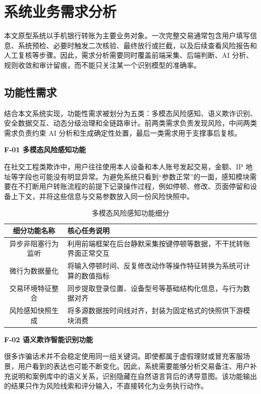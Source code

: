 \documentclass{xduugthesis}
\begin{document}
\section{系统业务需求分析}

本文原型系统以手机银行转账为主要业务对象。一次完整交易通常包含用户填写信息、系统预检、必要时触发二次核验、最终放行或拦截，以及后续查看风险报告和人工复核等步骤。因此，需求分析需要同时覆盖前端采集、后端判断、AI 分析、规则收敛和审计留痕，而不能只关注某一个识别模型的准确率。

\subsection{功能性需求}

结合本文系统实现，功能性需求被划分为五类：多模态风险感知、语义欺诈识别、安全数据交互、动态分级治理和全链路审计。前两类需求负责发现风险，中间两类需求负责约束 AI 分析和生成确定性处置，最后一类需求用于支撑事后复核。

\textbf{F-01 多模态风险感知功能}

在社交工程类欺诈中，用户往往使用本人设备和本人账号发起交易，金额、IP 地址等字段也可能没有明显异常。为避免系统只看到“参数正常”的一面，感知模块需要在不打断用户转账流程的前提下记录操作过程，例如停顿、修改、页面停留和设备上下文，并将这些信息与交易参数放入同一份风险快照中。

\begin{table}[H]
    \centering
    \caption{多模态风险感知功能细分}
    \label{tab:f01-sub}
    \begin{tabular}{|c|p{7cm}|}
        \hline
        细分功能名称 & 核心任务说明 \\
        \hline
        异步非阻塞行为监听 & 利用前端框架在后台静默采集按键停顿等数据，不干扰转账界面正常交互 \\
        \hline
        微行为数据量化 & 将输入停顿时间、反复修改动作等操作特征转换为系统可计算的数值指标 \\
        \hline
        交易环境特征整合 & 同步提取登录位置、设备型号等基础结构化信息，与行为数据对齐 \\
        \hline
        风险感知快照生成 & 将多源数据按时间线对齐，封装为固定格式的快照供下游模块消费 \\
        \hline
    \end{tabular}
\end{table}

\textbf{F-02 语义欺诈智能识别功能}

很多诈骗话术并不会稳定使用同一组关键词。即使都属于虚假理财或冒充客服场景，用户看到的表达也可能不断变化。因此，系统需要能够分析交易备注、用户补充说明和案例库中的语义关系，识别隐藏在自然语言背后的诱导意图。该功能输出的结果只作为风险线索和评分输入，不直接转化为业务执行动作。
\end{document}

